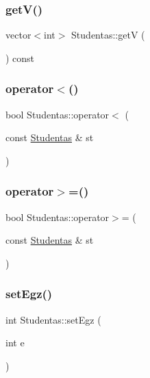 \mbox{\label{class_studentas_a118f19c598829443b72d6c58db30530a}} 
\subsubsection{\texorpdfstring{getV()}{getV()}}
{\footnotesize\ttfamily vector$<$int$>$ Studentas\+::getV (\begin{DoxyParamCaption}{ }\end{DoxyParamCaption}) const\hspace{0.3cm}{\ttfamily [inline]}}

\mbox{\label{class_studentas_a9ad5e649c7ddb16d39024011b84f7f42}} 
\subsubsection{\texorpdfstring{operator$<$()}{operator<()}}
{\footnotesize\ttfamily bool Studentas\+::operator$<$ (\begin{DoxyParamCaption}\item[{const \mbox{\hyperlink{class_studentas}{Studentas}} \&}]{st }\end{DoxyParamCaption})}

\mbox{\label{class_studentas_a8d3e642c70dc38794fa9fc8d828892c7}} 
\subsubsection{\texorpdfstring{operator$>$=()}{operator>=()}}
{\footnotesize\ttfamily bool Studentas\+::operator$>$= (\begin{DoxyParamCaption}\item[{const \mbox{\hyperlink{class_studentas}{Studentas}} \&}]{st }\end{DoxyParamCaption})}

\mbox{\label{class_studentas_aa6798e0694f584a82485fcb858652313}} 
\subsubsection{\texorpdfstring{setEgz()}{setEgz()}}
{\footnotesize\ttfamily int Studentas\+::set\+Egz (\begin{DoxyParamCaption}\item[{int}]{e }\end{DoxyParamCaption})}

